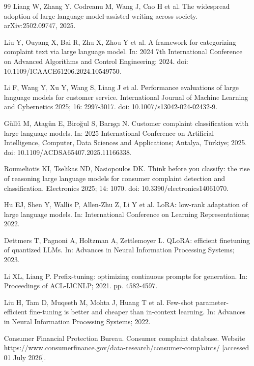 \documentclass{elektr}
\begin{document}
\begin{thebibliography}{99}
 Liang W, Zhang Y, Codreanu M, Wang J, Cao H et al. The widespread adoption of large language model-assisted writing across society. arXiv:2502.09747, 2025.

 Liu Y, Ouyang X, Bai R, Zhu X, Zhou Y et al. A framework for categorizing complaint text via large language model. In: 2024 7th International Conference on Advanced Algorithms and Control Engineering; 2024. doi: 10.1109/ICAACE61206.2024.10549750.

 Li F, Wang Y, Xu Y, Wang S, Liang J et al. Performance evaluations of large language models for customer service. International Journal of Machine Learning and Cybernetics 2025; 16: 2997-3017. doi: 10.1007/s13042-024-02432-9.

 Güllü M, Atagün E, Biroğul S, Barışçı N. Customer complaint classification with large language models. In: 2025 International Conference on Artificial Intelligence, Computer, Data Sciences and Applications; Antalya, Türkiye; 2025. doi: 10.1109/ACDSA65407.2025.11166338.

 Roumeliotis KI, Tselikas ND, Nasiopoulos DK. Think before you classify: the rise of reasoning large language models for consumer complaint detection and classification. Electronics 2025; 14: 1070. doi: 10.3390/electronics14061070.

 Hu EJ, Shen Y, Wallis P, Allen-Zhu Z, Li Y et al. LoRA: low-rank adaptation of large language models. In: International Conference on Learning Representations; 2022.

 Dettmers T, Pagnoni A, Holtzman A, Zettlemoyer L. QLoRA: efficient finetuning of quantized LLMs. In: Advances in Neural Information Processing Systems; 2023.

 Li XL, Liang P. Prefix-tuning: optimizing continuous prompts for generation. In: Proceedings of ACL-IJCNLP; 2021. pp. 4582-4597.

 Liu H, Tam D, Muqeeth M, Mohta J, Huang T et al. Few-shot parameter-efficient fine-tuning is better and cheaper than in-context learning. In: Advances in Neural Information Processing Systems; 2022.

 Consumer Financial Protection Bureau. Consumer complaint database. Website https://www.consumerfinance.gov/data-research/consumer-complaints/ [accessed 01 July 2026].


\end{thebibliography}
\end{document}
